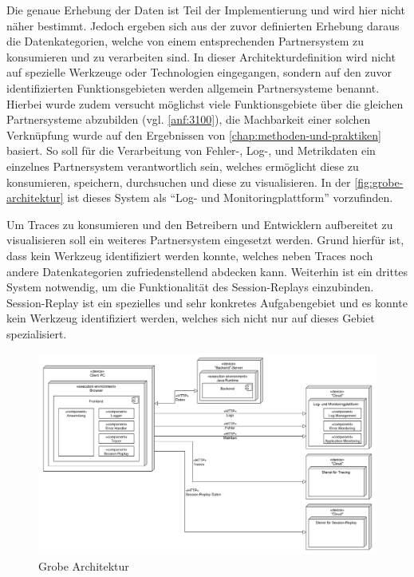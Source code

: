 	 Die genaue Erhebung der Daten ist Teil der Implementierung und wird hier nicht näher bestimmt. Jedoch ergeben sich aus der zuvor definierten Erhebung daraus die Datenkategorien, welche von einem entsprechenden Partnersystem zu konsumieren und zu verarbeiten sind. In dieser Architekturdefinition wird nicht auf spezielle Werkzeuge oder Technologien eingegangen, sondern auf den zuvor identifizierten Funktionsgebieten werden allgemein Partnersysteme benannt. Hierbei wurde zudem versucht möglichst viele Funktionsgebiete über die gleichen Partnersysteme abzubilden (vgl. \autoref{anf:3100}), die Machbarkeit einer solchen Verknüpfung wurde auf den Ergebnissen von \autoref{chap:methoden-und-praktiken} basiert. So soll für die Verarbeitung von Fehler-, Log-, und Metrikdaten ein einzelnes Partnersystem verantwortlich sein, welches ermöglicht diese zu konsumieren, speichern, durchsuchen und diese zu visualisieren. In der \autoref{fig:grobe-architektur} ist dieses System als \enquote{Log- und Monitoringplattform} vorzufinden.
	
	Um Traces zu konsumieren und den Betreibern und Entwicklern aufbereitet zu visualisieren soll ein weiteres Partnersystem eingesetzt werden. Grund hierfür ist, dass kein Werkzeug identifiziert werden konnte, welches neben Traces noch andere Datenkategorien zufriedenstellend abdecken kann. Weiterhin ist ein drittes System notwendig, um die Funktionalität des Session-Replays einzubinden. Session-Replay ist ein spezielles und sehr konkretes Aufgabengebiet und es konnte kein Werkzeug identifiziert werden, welches sich nicht nur auf dieses Gebiet spezialisiert.
	
\begin{figure}[H]
	\centering
	\includegraphics[width=0.65\linewidth]{img/04_erstellung-poc/konzept-simple.png}
	\caption{Grobe Architektur}
	\label{fig:grobe-architektur}
\end{figure}

